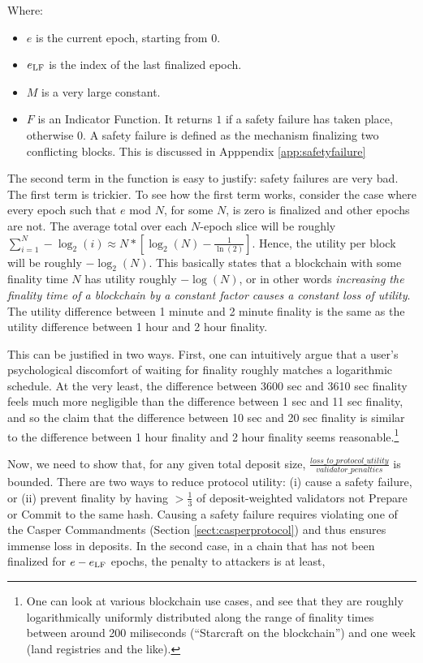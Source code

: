 \documentclass[12pt, final]{article}
\newcommand{\epoch}{\ensuremath{e}\xspace}
\newcommand{\epochLF}{\ensuremath{\epoch_{\textnormal{LF}}}\xspace}
\begin{document}
Where:

\begin{itemize}
\item $\epoch$ is the current epoch, starting from $0$.
\item $\epochLF$ is the index of the last finalized epoch. \todo{To be clear, does the \epochLF change with the term $k$, or is it fixed?}
\item $M$ is a very large constant.
\item $F$ is an Indicator Function.  It returns $1$ if a safety failure has taken place, otherwise 0. A safety failure is defined as the mechanism finalizing two conflicting blocks. This is discussed in Apppendix \ref{app:safetyfailure}
\end{itemize}

The second term in the function is easy to justify: safety failures are very bad. The first term is trickier. To see how the first term works, consider the case where every epoch such that $\epoch$ mod $N$, for some $N$, is zero is finalized and other epochs are not. The average total over each $N$-epoch slice will be roughly $\sum_{i=1}^N -\log_2(i) \approx N * \left[ \log_2(N) - \frac{1}{\ln(2)} \right]$. Hence, the utility per block will be roughly $-\log_2(N)$. This basically states that a blockchain with some finality time $N$ has utility roughly $-\log(N)$, or in other words \emph{increasing the finality time of a blockchain by a constant factor causes a constant loss of utility}. The utility difference between 1 minute and 2 minute finality is the same as the utility difference between 1 hour and 2 hour finality.

This can be justified in two ways. First, one can intuitively argue that a user's psychological discomfort of waiting for finality roughly matches a logarithmic schedule. At the very least, the difference between 3600 sec and 3610 sec finality feels much more negligible than the difference between 1 sec and 11 sec finality, and so the claim that the difference between 10 sec and 20 sec finality is similar to the difference between 1 hour finality and 2 hour finality seems reasonable.\footnote{One can look at various blockchain use cases, and see that they are roughly logarithmically uniformly distributed along the range of finality times between around 200 miliseconds (``Starcraft on the blockchain'') and one week (land registries and the like). }

Now, we need to show that, for any given total deposit size, $\frac{loss\_to\_protocol\_utility}{validator\_penalties}$ is bounded. There are two ways to reduce protocol utility: (i) cause a safety failure, or (ii) prevent finality by having $> \frac{1}{3}$ of deposit-weighted validators not Prepare or Commit to the same hash.  Causing a safety failure requires violating one of the Casper Commandments (Section \ref{sect:casperprotocol}) and thus ensures immense loss in deposits.  In the second case, in a chain that has not been finalized for $\epoch - \epochLF$ epochs, the penalty to attackers is at least,
\end{document}
